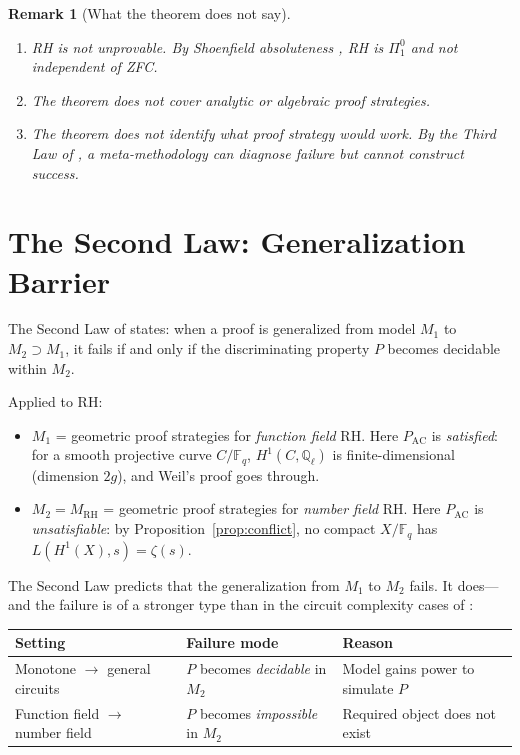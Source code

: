 \documentclass[12pt]{article}
\newtheorem{remark}[theorem]{Remark}
\newcommand{\FF}{\mathbb{F}}
\newcommand{\Ql}{\mathbb{Q}_\ell}
\newcommand{\MRH}{M_{\mathrm{RH}}}
\newcommand{\PAC}{P_{\mathrm{AC}}}
\begin{document}
\begin{remark}[What the theorem does not say]
\begin{enumerate}
\item RH is not unprovable. By Shoenfield absoluteness
  \cite{shoenfield1961}, RH is $\Pi^0_1$ and not independent of ZFC.
\item The theorem does not cover analytic or algebraic proof strategies.
\item The theorem does not identify what proof strategy \emph{would}
  work. By the Third Law of \cite{metamethod2026}, a meta-methodology
  can diagnose failure but cannot construct success.
\end{enumerate}
\end{remark}

\section{The Second Law: Generalization Barrier}
\label{sec:second}

The Second Law of \cite{metamethod2026} states: when a proof is
generalized from model $M_1$ to $M_2 \supset M_1$, it fails if and
only if the discriminating property $P$ becomes decidable within $M_2$.

Applied to RH:

\begin{itemize}
\item $M_1$ = geometric proof strategies for \emph{function field} RH.
  Here $\PAC$ is \emph{satisfied}: for a smooth projective curve
  $C/\FF_q$, $H^1(C, \Ql)$ is finite-dimensional (dimension $2g$),
  and Weil's proof \cite{weil1948} goes through.

\item $M_2 = \MRH$ = geometric proof strategies for \emph{number field}
  RH. Here $\PAC$ is \emph{unsatisfiable}: by
  Proposition~\ref{prop:conflict}, no compact $X/\FF_q$ has
  $L(H^1(X),s) = \zeta(s)$.
\end{itemize}

The Second Law predicts that the generalization from $M_1$ to $M_2$
fails. It does---and the failure is of a stronger type than in the
circuit complexity cases of \cite{metamethod2026}:

\begin{center}
\begin{tabular}{lll}
\toprule
Setting & Failure mode & Reason \\
\midrule
Monotone $\to$ general circuits & $P$ becomes \emph{decidable} in $M_2$
  & Model gains power to simulate $P$ \\
Function field $\to$ number field & $P$ becomes \emph{impossible} in $M_2$
  & Required object does not exist \\
\bottomrule
\end{tabular}
\end{center}
\end{document}
